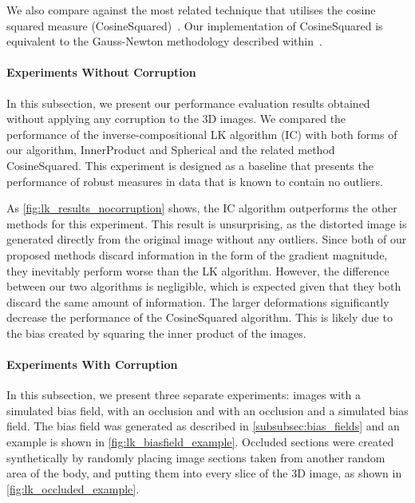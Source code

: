 We also compare against the most related technique that utilises the cosine
squared measure (CosineSquared)~\cite{haber2006intensity}. Our implementation of
CosineSquared is equivalent to the Gauss-Newton methodology described
within~\cite{haber2006intensity}.
\paragraph{Experiments Without Corruption}\label{subsec:lk_results_nocorruption}
In this subsection, we present our performance evaluation results obtained
without applying any corruption to the 3D images. We compared the performance of
the inverse-compositional LK algorithm (IC) with both forms of our algorithm,
InnerProduct and Spherical and the related method CosineSquared. This experiment
is designed as a baseline that presents the performance of robust measures in
data that is known to contain no outliers.

As \cref{fig:lk_results_nocorruption} shows, the IC algorithm outperforms
the other methods for this experiment. This result is unsurprising, as the
distorted image is generated directly from the original image without any
outliers. Since both of our proposed methods discard information in the form of
the gradient magnitude, they inevitably perform worse than the LK algorithm.
However, the difference between our two algorithms is negligible, which is
expected given that they both discard the same amount of information. The larger
deformations significantly decrease the performance of the CosineSquared
algorithm. This is likely due to the bias created by squaring the inner product
of the images.
\paragraph{Experiments With Corruption}\label{subsec:lk_results_corrupted}
In this subsection, we present three separate experiments: images with a
simulated bias field, with an occlusion and with an occlusion and a simulated
bias field. The bias field was generated as described in
\cref{subsubsec:bias_fields} and an example is shown in
\cref{fig:lk_biasfield_example}. Occluded sections were created
synthetically by randomly placing image sections taken from another random area
of the body, and putting them into every slice of the 3D image, as shown in
\cref{fig:lk_occluded_example}.

